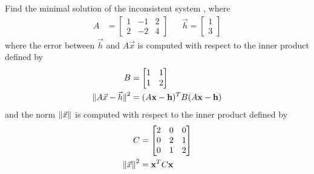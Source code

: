 \begin{exmp}
Find the minimal solution of the inconsistent system , where 
\begin{align*}
A &= 
\begin{bmatrix}
1 & -1 & 2 \\
2 & -2 & 4
\end{bmatrix} 
& & \vec{h} =
\begin{bmatrix}
1 \\
3
\end{bmatrix}
\end{align*} 
where the error between $\vec{h}$ and $A\vec{x}$ is computed with respect to the inner product defined by
\begin{align*}
B &= 
\begin{bmatrix}
1 & 1 \\
1 & 2
\end{bmatrix} \\
\norm{\smash{A\vec{x} - \vec{h}}}^2 &= (A\textbf{x} - \textbf{h})^T B(A\textbf{x} - \textbf{h})
\end{align*}
and the norm $\norm{\vec{x}}$ is computed with respect to the inner product defined by
\begin{align*}
C &= 
\begin{bmatrix}
2 & 0 & 0 \\
0 & 2 & 1 \\
0 & 1 & 2
\end{bmatrix} \\
\norm{\vec{x}}^2 &= \textbf{x}^TC\textbf{x}
\end{align*}
\end{exmp}
